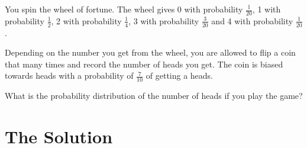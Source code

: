 \documentclass{article}
\begin{document}
\begin{flushleft}
You spin the wheel of fortune. The wheel gives $0$ with probability $\frac{1}{20}$, 1 with probability $\frac{1}{2}$, 2 with probability $\frac{1}{4}$, 3 with probability $\frac{3}{20}$ and 4 with probability $\frac{1}{20}$.\newline

Depending on the number you get from the wheel, you are allowed to flip a coin that many times and record the number of heads you get. The coin is biased towards heads with a probability of $\frac{7}{10}$ of getting a heads.\newline

What is the probability distribution of the number of heads if you play the game?
\end{flushleft}

\section{The Solution} %
\end{document}
